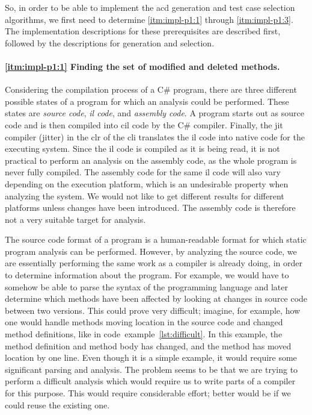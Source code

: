 \documentclass[a4paper,english,12pt]{report}
\begin{document}
So, in order to be able to implement the \gls{acd} generation and test case selection algorithms, we first need to determine \ref{itm:impl-p1:1} through \ref{itm:impl-p1:3}. The implementation descriptions for these prerequisites are described first, followed by the descriptions for generation and selection.

\paragraph{\ref{itm:impl-p1:1} Finding the set of modified and deleted methods.} Considering the compilation process of a C\# program, there are three different possible states of a program for which an analysis could be performed. These states are \textit{source code}, \textit{\gls{il} code}, and \textit{assembly code}. A program starts out as source code and is then compiled into \gls{cil} code by the C\# compiler. Finally, the 
\gls{jit} compiler (\gls{jitter}) in the \gls{clr} of the \gls{cli} translates the \gls{il} code into native code for the executing system. \citep{rahman2012expert} Since the \gls{il} code is compiled as it is being read, it is not practical to perform an analysis on the assembly code, as the whole program is never fully compiled. The assembly code for the same \gls{il} code will also vary depending on the execution platform, which is an undesirable property when analyzing the system. We would not like to get different results for different platforms unless changes have been introduced. The assembly code is therefore not a very suitable target for analysis.

The source code format of a program is a human-readable format for which static program analysis can be performed. However, by analyzing the source code, we are essentially performing the same work as a compiler is already doing, in order to determine information about the program. For example, we would have to somehow be able to parse the syntax of the programming language and later determine which methods have been affected by looking at changes in source code between two versions. This could prove very difficult; imagine, for example, how one would handle methods moving location in the source code and changed method definitions, like in code~example~\ref{lst:difficult}. In this example, the method definition and method body has changed, and the method has moved location by one line. Even though it is a simple example, it would require some significant parsing and analysis. The problem seems to be that we are trying to perform a difficult analysis which would require us to write parts of a compiler for this purpose. This would require considerable effort; better would be if we could reuse the existing one.
\end{document}
